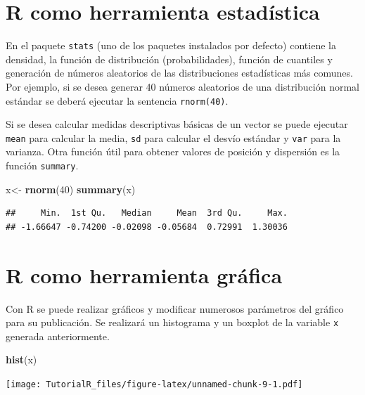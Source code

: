 \documentclass[]{book}
\newenvironment{Shaded}{\begin{snugshade}}{\end{snugshade}}
\newcommand{\KeywordTok}[1]{\textcolor[rgb]{0.13,0.29,0.53}{\textbf{#1}}}
\newcommand{\DecValTok}[1]{\textcolor[rgb]{0.00,0.00,0.81}{#1}}
\newcommand{\StringTok}[1]{\textcolor[rgb]{0.31,0.60,0.02}{#1}}
\newcommand{\NormalTok}[1]{#1}
\begin{document}
\section{R como herramienta
estadística}\label{r-como-herramienta-estadistica}

En el paquete \texttt{stats} (uno de los paquetes instalados por
defecto) contiene la densidad, la función de distribución
(probabilidades), función de cuantiles y generación de números
aleatorios de las distribuciones estadísticas más comunes. Por ejemplo,
si se desea generar 40 números aleatorios de una distribución normal
estándar se deberá ejecutar la sentencia \texttt{rnorm(40)}.

Si se desea calcular medidas descriptivas básicas de un vector se puede
ejecutar \texttt{mean} para calcular la media, \texttt{sd} para calcular
el desvío estándar y \texttt{var} para la varianza. Otra función útil
para obtener valores de posición y dispersión es la función
\texttt{summary}.

\begin{Shaded}
\begin{Highlighting}[]
\NormalTok{x<-}\StringTok{ }\KeywordTok{rnorm}\NormalTok{(}\DecValTok{40}\NormalTok{)}
\KeywordTok{summary}\NormalTok{(x)}
\end{Highlighting}
\end{Shaded}

\begin{verbatim}
##     Min.  1st Qu.   Median     Mean  3rd Qu.     Max. 
## -1.66647 -0.74200 -0.02098 -0.05684  0.72991  1.30036
\end{verbatim}

\section{R como herramienta gráfica}\label{r-como-herramienta-grafica}

Con R se puede realizar gráficos y modificar numerosos parámetros del
gráfico para su publicación. Se realizará un histograma y un boxplot de
la variable \texttt{x} generada anteriormente.

\begin{Shaded}
\begin{Highlighting}[]
\KeywordTok{hist}\NormalTok{(x)}
\end{Highlighting}
\end{Shaded}

\texttt{[image: TutorialR\_files/figure-latex/unnamed-chunk-9-1.pdf]}
\end{document}
